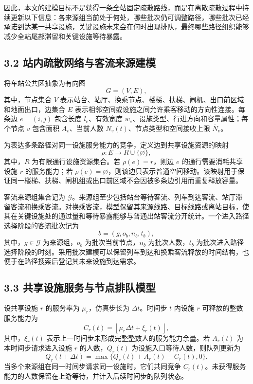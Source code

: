 \documentclass[UTF8,a4paper,12pt]{ctexart}
\begin{document}
因此，本文的建模目标不是获得一条全站固定疏散路线，而是在离散疏散过程中持续更新以下信息：各来源组当前处于何处，哪些批次仍可调整路径，哪些批次已经承诺到达某一共享设施，关键设施未来会在何时出现排队，最终哪些路径组织能够减少全站尾部滞留和关键设施等待暴露。

\subsection{3.2 站内疏散网络与客流来源建模}

将车站公共区抽象为有向图
\[
G=(V,E),
\]
其中，节点集合 \(V\) 表示站台、站厅、换乘节点、楼梯、扶梯、闸机、出口前区域和地面出口，边集合 \(E\) 表示相邻空间或设施之间允许乘客移动的方向性连接。每条边 \(e=(i,j)\) 包含长度 \(l_e\)、有效宽度 \(w_e\)、设施类型、行进方向和容量属性；每个节点 \(v\) 包含面积 \(A_v\)、当前人数 \(N_v(t)\)、节点类型和空间接收上限 \(\bar N_v\)。

为表达多条路径对同一设施服务能力的竞争，定义边到共享设施资源的映射
\[
\rho:E\rightarrow R\cup\{\varnothing\},
\]
其中，\(R\) 为有限通行设施资源集合。若 \(\rho(e)=r\)，则边 \(e\) 的通行需要消耗共享设施 \(r\) 的服务能力；若 \(\rho(e)=\varnothing\)，则该边只表示普通空间移动。该映射用于保证同一楼梯、扶梯、闸机组或出口前区域不会因被多条边引用而重复释放容量。

客流来源组集合记为 \(\mathcal{G}\)。来源组至少包括站台等待客流、列车到达客流、站厅滞留客流和换乘客流。对换乘客流，模型保留其来源线路、目标线路或离站目标，使其在关键设施处的通过量和等待暴露能够与普通出站客流分开统计。一个进入路径选择阶段的客流批次记为
\[
b=(g,o_b,n_b,t_b),
\]
其中，\(g\in\mathcal{G}\) 为来源组，\(o_b\) 为批次当前节点，\(n_b\) 为批次人数，\(t_b\) 为批次进入路径选择阶段的时刻。采用批次建模可以保留列车到达和换乘客流释放的时间结构，也便于在路径搜索后登记其未来设施到达需求。

\subsection{3.3 共享设施服务与节点排队模型}

设共享设施 \(r\) 的服务率为 \(\mu_r\)，仿真步长为 \(\Delta t\)。时间步 \(t\) 内设施 \(r\) 可释放的整数服务能力为
\[
C_r(t)=\left\lfloor \mu_r\Delta t+\xi_r(t)\right\rfloor ,
\]
其中，\(\xi_r(t)\) 表示上一时间步未形成完整整数人的服务能力余量。若 \(A_r(t)\) 为本时间步请求进入设施 \(r\) 的人数，\(Q_r(t)\) 为设施入口等待人数，则队列更新为
\[
Q_r(t+\Delta t)=\max\{Q_r(t)+A_r(t)-C_r(t),0\}.
\]
当多个来源组在同一时间步请求同一设施时，它们共同竞争 \(C_r(t)\)。未获得服务能力的人数保留在上游等待，并计入后续时间步的队列状态。
\end{document}
